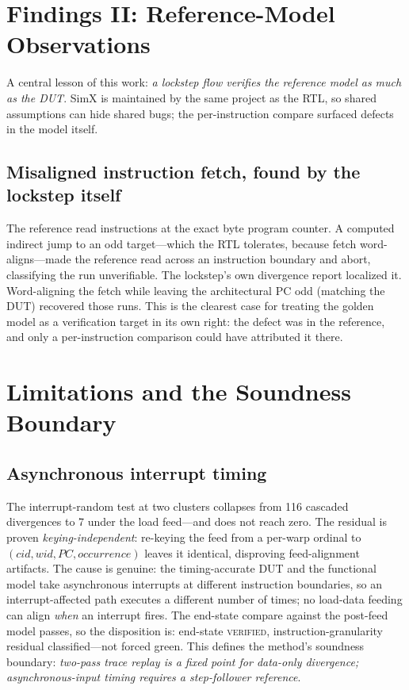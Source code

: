 \documentclass[conference]{IEEEtran}
\begin{document}
\section{Findings II: Reference-Model Observations}
\label{sec:reffindings}

A central lesson of this work: \emph{a lockstep flow verifies the
reference model as much as the DUT}. SimX is maintained by the same
project as the RTL, so shared assumptions can hide shared bugs; the
per-instruction compare surfaced defects in the model itself.

\subsection{Misaligned instruction fetch, found by the lockstep itself}
The reference read instructions at the exact byte program counter. A
computed indirect jump to an odd target---which the RTL tolerates,
because fetch word-aligns---made the reference read across an
instruction boundary and abort, classifying the run unverifiable. The
lockstep's own divergence report localized it. Word-aligning the fetch
while leaving the architectural PC odd (matching the DUT) recovered
those runs. This is the clearest case for treating the golden model as a
verification target in its own right: the defect was in the reference,
and only a per-instruction comparison could have attributed it there.

\section{Limitations and the Soundness Boundary}
\label{sec:limits}

\subsection{Asynchronous interrupt timing}
The interrupt-random test at two clusters collapses from 116 cascaded
divergences to 7 under the load feed---and does not reach zero. The
residual is proven \emph{keying-independent}: re-keying the feed from a
per-warp ordinal to $(\textit{cid},\textit{wid},\textit{PC},
\textit{occurrence})$ leaves it identical, disproving feed-alignment
artifacts. The cause is genuine: the timing-accurate DUT and the
functional model take asynchronous interrupts at different instruction
boundaries, so an interrupt-affected path executes a different number
of times; no load-data feeding can align \emph{when} an interrupt
fires. The end-state compare against the post-feed model passes, so the
disposition is: end-state \textsc{verified}, instruction-granularity
residual classified---not forced green. This defines the method's
soundness boundary: \emph{two-pass trace replay is a fixed point for
data-only divergence; asynchronous-input timing requires a
step-follower reference}.
\end{document}
